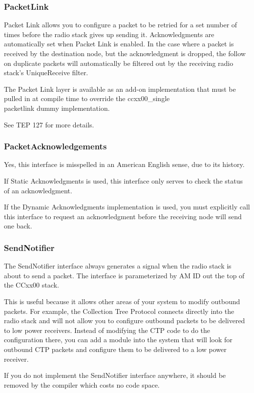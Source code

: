 \documentclass{article}
\begin{document}
\subsubsection{PacketLink}
Packet Link allows you to configure a packet to be retried for a set number of times before
the radio stack gives up sending it. Acknowledgments are automatically set when Packet Link
is enabled. In the case where a packet is received by the destination node, but the acknowledgment
is dropped, the follow on duplicate packets will automatically be filtered out by the receiving 
radio stack's UniqueReceive filter.

The Packet Link layer is available as an add-on implementation that must be pulled in at compile time to
override the ccxx00\_single\\packetlink dummy implementation.

See TEP 127 \cite{tep127} for more details.

\subsubsection{PacketAcknowledgements}
Yes, this interface is misspelled in an American English sense, due to its history. 

If Static Acknowledgments is used, this interface only serves to check the status of
an acknowledgment.  

If the Dynamic Acknowledgments implementation is used, you must explicitly call this 
interface to request an acknowledgment before the receiving node will send one back.

\subsubsection{SendNotifier}
The SendNotifier interface always generates a signal when the radio stack is about to send
a packet. The interface is parameterized by AM ID out the top of the CCxx00 stack. 

This is useful because it allows other areas of your system to modify outbound packets. 
For example, the Collection Tree Protocol connects directly into the radio stack and will not allow you
to configure outbound packets to be delivered to low power receivers. Instead of modifying
the CTP \cite{ctp} code to do the configuration there, you can add a module into the system that will
look for outbound CTP packets and configure them to be delivered to a low power receiver.

If you do not implement the SendNotifier interface anywhere, it should be removed by the
compiler which costs no code space.
\end{document}
